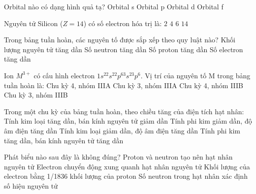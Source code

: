 	\begin{ex}
		Orbital nào có dạng hình quả tạ?
		\choice
		{Orbital s}
		{Orbital p}
		{Orbital d}
		{Orbital f}
		\loigiai{}
	\end{ex}
	
	\begin{ex}
		Nguyên tử Silicon ($Z=14$) có số electron hóa trị là:
		\choice
		{$2$}
		{$4$}
		{$6$}
		{$14$}
		\loigiai{}
	\end{ex}
	
	\begin{ex}
		Trong bảng tuần hoàn, các nguyên tố được sắp xếp theo quy luật nào?
		\choice
		{Khối lượng nguyên tử tăng dần}
		{Số neutron tăng dần}
		{Số proton tăng dần}
		{Số electron tăng dần}
		\loigiai{}
	\end{ex}
	
	\begin{ex}
		Ion $M^{3+}$ có cấu hình electron $1s^22s^22p^63s^23p^6$. Vị trí của nguyên tố M trong bảng tuần hoàn là:
		\choice
		{Chu kỳ 4, nhóm IIIA}
		{Chu kỳ 3, nhóm IIIA}
		{Chu kỳ 4, nhóm IIIB}
		{Chu kỳ 3, nhóm IIIB}
		\loigiai{}
	\end{ex}
	
	\begin{ex}
		Trong một chu kỳ của bảng tuần hoàn, theo chiều tăng của điện tích hạt nhân:
		\choice
		{Tính kim loại tăng dần, bán kính nguyên tử giảm dần}
		{Tính phi kim giảm dần, độ âm điện tăng dần}
		{Tính kim loại giảm dần, độ âm điện tăng dần}
		{Tính phi kim tăng dần, bán kính nguyên tử tăng dần}
		\loigiai{}
	\end{ex}
	
	\begin{ex}
		Phát biểu nào sau đây là không đúng?
		\choice
		{Proton và neutron tạo nên hạt nhân nguyên tử}
		{Electron chuyển động xung quanh hạt nhân nguyên tử}
		{Khối lượng của electron bằng 1/1836 khối lượng của proton}
		{Số neutron trong hạt nhân xác định số hiệu nguyên tử}
		\loigiai{}
	\end{ex}
	
